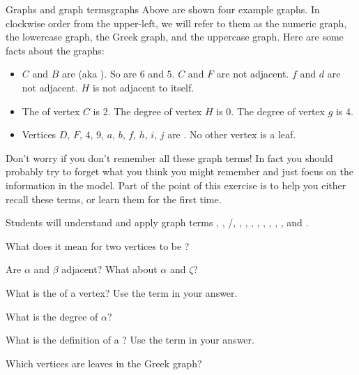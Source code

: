 \documentclass{tufte-handout}
\begin{document}
\begin{model}{Graphs and graph terms}{graphs}
  Above are shown four example graphs.  In clockwise order from the
  upper-left, we will refer to them as the numeric graph, the
  lowercase graph, the Greek graph, and the uppercase graph.  Here are
  some facts about the graphs:

  \begin{itemize}
  \item $C$ and $B$ are  (aka ).  So
    are $6$ and $5$.  $C$ and $F$ are not adjacent.  $f$ and $d$ are
    not adjacent.  $H$ is not adjacent to itself.
  \item The  of vertex $C$ is 2.  The degree of vertex $H$ is
    0.  The degree of vertex $g$ is 4.
  \item Vertices $D$, $F$, $4$, $9$, $a$, $b$, $f$, $h$, $i$, $j$ are
    .  No other vertex is a leaf.
  \end{itemize}
\end{model}

Don't worry if you don't remember all these graph terms!  In fact you
should probably try to forget what you think you might remember and
just focus on the information in the model. Part of the point of this
exercise is to help you either recall these terms, or learn them for
the first time.

\begin{objective}
  Students will understand and apply graph terms ,
  , /, , ,
  , , ,
  , , , and .
\end{objective}

\begin{questions}
\item What does it mean for two vertices to be ?
\item Are $\alpha$ and $\beta$ adjacent?   What about $\alpha$ and $\zeta$?
\item What is the  of a vertex?  Use the term
   in your answer.
\item What is the degree of $\alpha$?
\item What is the definition of a ?  Use the term
   in your answer.
\item Which vertices are leaves in the Greek graph?
\end{questions}
\end{document}
